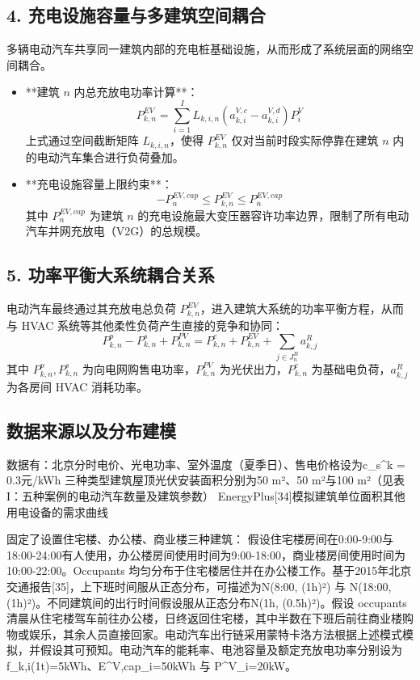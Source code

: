 \documentclass[11pt]{ctexart}
\begin{document}
\subsection*{4. 充电设施容量与多建筑空间耦合}
多辆电动汽车共享同一建筑内部的充电桩基础设施，从而形成了系统层面的网络空间耦合。
\begin{itemize}
    \item **建筑 $n$ 内总充放电功率计算**：
    \begin{equation}
        P_{k,n}^{EV} = \sum_{i=1}^{I} L_{k,i,n} (a_{k,i}^{V,c} - a_{k,i}^{V,d}) P_{i}^{V}
    \end{equation}
    上式通过空间截断矩阵 $L_{k,i,n}$，使得 $P_{k,n}^{EV}$ 仅对当前时段实际停靠在建筑 $n$ 内的电动汽车集合进行负荷叠加。

    \item **充电设施容量上限约束**：
    \begin{equation}
        -P_{n}^{EV,cap} \le P_{k,n}^{EV} \le P_{n}^{EV,cap}
    \end{equation}
    其中 $P_{n}^{EV,cap}$ 为建筑 $n$ 的充电设施最大变压器容许功率边界，限制了所有电动汽车并网充放电（V2G）的总规模。
\end{itemize}

\subsection*{5. 功率平衡大系统耦合关系}
电动汽车最终通过其充放电总负荷 $P_{k,n}^{EV}$，进入建筑大系统的功率平衡方程，从而与 HVAC 系统等其他柔性负荷产生直接的竞争和协同：
\begin{equation}
    P_{k,n}^{p} - P_{k,n}^{s} + P_{k,n}^{PV} = P_{k,n}^{e} + P_{k,n}^{EV} + \sum_{j \in J_n^B} a_{k,j}^{R}
\end{equation}
其中 $P_{k,n}^{p}, P_{k,n}^{s}$ 为向电网购售电功率，$P_{k,n}^{PV}$ 为光伏出力，$P_{k,n}^{e}$ 为基础电负荷，$a_{k,j}^{R}$ 为各房间 HVAC 消耗功率。

\subsection*{数据来源以及分布建模}
数据有：北京分时电价、光电功率、室外温度（夏季日）、售电价格设为c_s^k = 0.3元/kWh
三种类型建筑屋顶光伏安装面积分别为50 m²、50 m²与100 m²（见表I：五种案例的电动汽车数量及建筑参数）
EnergyPlus[34]模拟建筑单位面积其他用电设备的需求曲线

固定了设置住宅楼、办公楼、商业楼三种建筑：
假设住宅楼房间在0:00-9:00与18:00-24:00有人使用，办公楼房间使用时间为9:00-18:00，商业楼房间使用时间为10:00-22:00。Occupants 均匀分布于住宅楼居住并在办公楼工作。基于2015年北京交通报告[35]，上下班时间服从正态分布，可描述为N(8:00, (1h)²) 与 N(18:00, (1h)²)。不同建筑间的出行时间假设服从正态分布N(1h, (0.5h)²)。假设 occupants 清晨从住宅楼驾车前往办公楼，日终返回住宅楼，其中半数在下班后前往商业楼购物或娱乐，其余人员直接回家。电动汽车出行链采用蒙特卡洛方法根据上述模式模拟，并假设其可预知。电动汽车的能耗率、电池容量及额定充放电功率分别设为f_{k,i}(1t)=5kWh、E^{V,cap}_i=50kWh 与 P^V_i=20kW。
\end{document}
